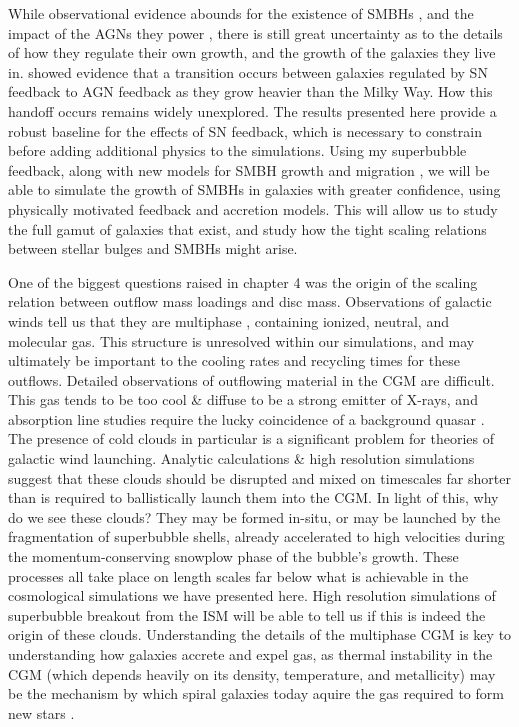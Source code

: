 While observational evidence abounds for the existence of SMBHs
\citep{Kormendy2013}, and the impact of the AGNs they power
\citep{Veilleux2005}, there is still great uncertainty as to the details of how
they regulate their own growth, and the growth of the galaxies they live in.
\citet{Keller2016a} showed evidence that a transition occurs between galaxies
regulated by SN feedback to AGN feedback as they grow heavier than the Milky
Way.  How this handoff occurs remains widely unexplored.  The results presented
here provide a robust baseline for the effects of SN feedback, which is
necessary to constrain before adding additional physics to the simulations.
Using my superbubble feedback, along with new models for SMBH growth
\citep{Hopkins2010} and migration \citep{Tremmel2015}, we will be able to
simulate the growth of SMBHs in galaxies with greater confidence, using
physically motivated feedback and accretion models.  This will allow us to study
the full gamut of galaxies that exist, and study how the tight scaling relations
between stellar bulges and SMBHs might arise.

One of the biggest questions raised in chapter 4 was the origin of the scaling
relation between outflow mass loadings and disc mass.  Observations of galactic
winds tell us that they are multiphase \citep{Stark1984,Wakker1997,Weiner2009},
containing ionized, neutral, and molecular gas.  This structure is unresolved
within our simulations, and may ultimately be important to the cooling rates and
recycling times for these outflows.  Detailed observations of outflowing
material in the CGM are difficult. This gas tends to be too cool \& diffuse to
be a strong emitter of X-rays, and absorption line studies require the lucky
coincidence of a background quasar \citep{Weiner2009}.  The presence of cold
clouds in particular is a significant problem for theories of galactic wind
launching.  Analytic calculations \& high resolution
simulations suggest that these clouds should be disrupted and mixed on
timescales far shorter than is required to ballistically launch them into the
CGM.  In light of this, why do we see these clouds?  They may be formed in-situ,
or may be launched by the fragmentation of superbubble shells, already
accelerated to high velocities during the momentum-conserving snowplow phase of
the bubble's growth.  These processes all take place on length scales far below
what is achievable in the cosmological simulations we have presented here.
High resolution simulations of superbubble breakout from
the ISM will be able to tell us if this is indeed the origin of these clouds.
Understanding the details of the multiphase CGM is key to
understanding how galaxies accrete and expel gas, as thermal instability in the
CGM (which depends heavily on its density, temperature, and metallicity) may be
the mechanism by which spiral galaxies today aquire the gas required to
form new stars \citep{Marasco2012}.  


